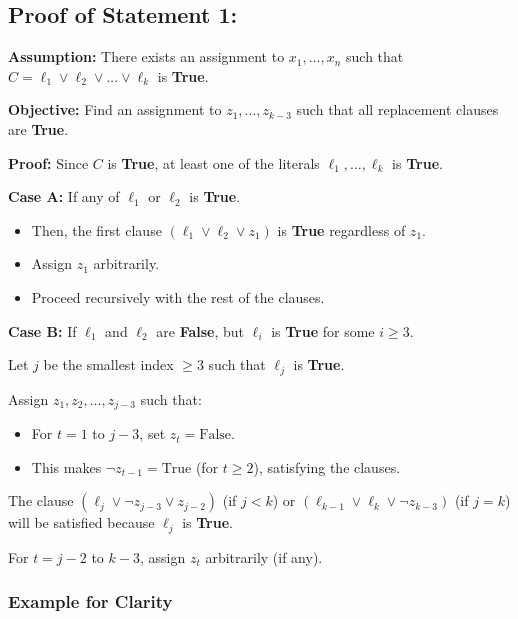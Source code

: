 \documentclass[a4paper]{article}
\begin{document}
\subsection*{Proof of Statement 1:}

\textbf{Assumption:} There exists an assignment to \( x_1, \ldots, x_n \) such that \( C = \ell_1 \lor \ell_2 \lor \ldots \lor \ell_k \) is \textbf{True}.

\textbf{Objective:} Find an assignment to \( z_1, \ldots, z_{k-3} \) such that all replacement clauses are \textbf{True}.

\textbf{Proof:}
Since \( C \) is \textbf{True}, at least one of the literals \( \ell_1, \ldots, \ell_k \) is \textbf{True}.

\textbf{Case A:} If any of \( \ell_1 \) or \( \ell_2 \) is \textbf{True}.
\begin{itemize}
    \item Then, the first clause \( (\ell_1 \lor \ell_2 \lor z_1) \) is \textbf{True} regardless of \( z_1 \).
    \item Assign \( z_1 \) arbitrarily.
    \item Proceed recursively with the rest of the clauses.
\end{itemize}

\textbf{Case B:} If \( \ell_1 \) and \( \ell_2 \) are \textbf{False}, but \( \ell_i \) is \textbf{True} for some \( i \geq 3 \).

Let \( j \) be the smallest index \( \geq 3 \) such that \( \ell_j \) is \textbf{True}.

Assign \( z_1, z_2, \ldots, z_{j-3} \) such that:
\begin{itemize}
    \item For \( t = 1 \) to \( j - 3 \), set \( z_t = \text{False} \).
    \item This makes \( \neg z_{t-1} = \text{True} \) (for \( t \geq 2 \)), satisfying the clauses.
\end{itemize}

The clause \( (\ell_j \lor \neg z_{j-3} \lor z_{j-2}) \) (if \( j < k \)) or \( (\ell_{k-1} \lor \ell_k \lor \neg z_{k-3}) \) (if \( j = k \)) will be satisfied because \( \ell_j \) is \textbf{True}.

For \( t = j - 2 \) to \( k - 3 \), assign \( z_t \) arbitrarily (if any).

\subsubsection*{Example for Clarity}
\end{document}
